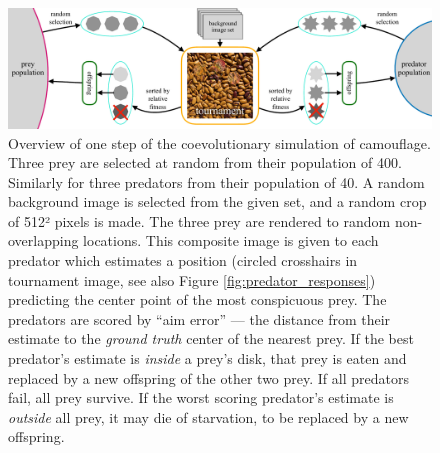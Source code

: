 \documentclass[letterpaper]{article}
\newcommand{\jargon}[1]{\textit{#1}}
\begin{document}
\begin{figure}
    \includegraphics[width=\textwidth]{coc_overview.pdf}
    \caption{Overview of one step of the coevolutionary simulation of camouflage. Three prey are selected at random from their population of 400. Similarly for three predators from their population of 40. A random background image is selected from the given set, and a random crop of 512² pixels is made. The three prey are rendered to random non-overlapping locations. This composite image is given to each predator which estimates a position (circled crosshairs in tournament image, see also Figure \ref{fig:predator_responses}) predicting the center point of the most conspicuous prey. The predators are scored by “aim error” — the distance from their estimate to the \jargon{ground truth} center of the nearest prey. If the best predator's estimate is \textit{inside} a prey's disk, that prey is eaten and replaced by a new offspring of the other two prey. If all predators fail, all prey survive. If the worst scoring predator's estimate is \textit{outside} all prey, it may die of starvation, to be replaced by a new offspring.}
    \label{fig:simulation_overview}
\end{figure}

\end{document}
